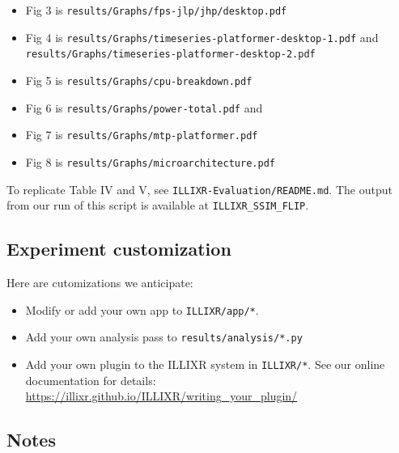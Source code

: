 \documentclass{sigplanconf}
\begin{document}
\begin{itemize}
\item Fig 3 is {\footnotesize\texttt{results/Graphs/fps-jlp/jhp/desktop.pdf}}
\item Fig 4 is {\footnotesize\texttt{results/Graphs/timeseries-platformer-desktop-1.pdf}} and {\footnotesize\texttt{results/Graphs/timeseries-platformer-desktop-2.pdf}}
\item Fig 5 is {\footnotesize\texttt{results/Graphs/cpu-breakdown.pdf}}
\item Fig 6 is {\footnotesize\texttt{results/Graphs/power-total.pdf}} and
\item Fig 7 is {\footnotesize\texttt{results/Graphs/mtp-platformer.pdf}}
\item Fig 8 is {\footnotesize\texttt{results/Graphs/microarchitecture.pdf}}
\end{itemize}

To replicate Table IV and V, see \texttt{ILLIXR-Evaluation/README.md}. The output from our run of this script is available at \texttt{ILLIXR\_SSIM\_FLIP}.

\subsection{Experiment customization}

Here are cutomizations we anticipate:

\begin{itemize}
\item Modify or add your own app to \texttt{ILLIXR/app/*}.
\item Add your own analysis pass to \texttt{results/analysis/*.py}
\item Add your own plugin to the ILLIXR system in \texttt{ILLIXR/*}. See our online documentation for details:\newline
{\footnotesize \url{https://illixr.github.io/ILLIXR/writing_your_plugin/}}
\end{itemize}

\subsection{Notes}
\end{document}
